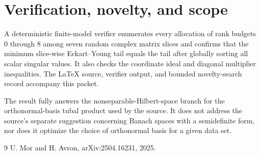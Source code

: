 \documentclass[11pt]{article}
\begin{document}
\section{Verification, novelty, and scope}

A deterministic finite-model verifier enumerates every allocation of rank
budgets $0$ through $8$ among seven random complex matrix slices and confirms
that the minimum slice-wise Eckart--Young tail equals the tail after globally
sorting all scalar singular values.  It also checks the coordinate ideal and
diagonal multiplier inequalities.  The LaTeX source, verifier output, and
bounded novelty-search record accompany this packet.

The result fully answers the nonseparable-Hilbert-space branch for the
orthonormal-basis tubal product used by the source.  It does not address the
source's separate suggestion concerning Banach spaces with a semidefinite
form, nor does it optimize the choice of orthonormal basis for a given data
set.

\sloppy
\begin{thebibliography}{9}
U. Mor and H. Avron,
arXiv:2504.16231, 2025.
\end{thebibliography}
\end{document}
